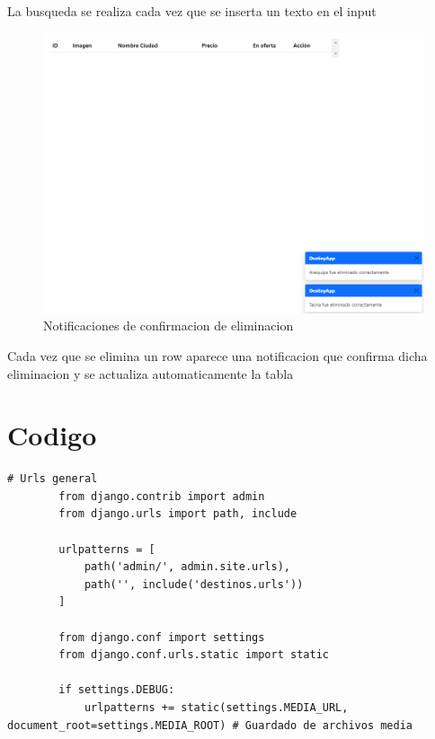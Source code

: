 \documentclass{article}
\begin{document}
        La busqueda se realiza cada vez que se inserta un texto en el input
        
        \begin{figure}
            \centering
            \includegraphics[width=150mm]{img/img10.png}
            \caption{Notificaciones de confirmacion de eliminacion}
            \label{fig:enter-label}
        \end{figure}
        
        Cada vez que se elimina un row aparece una notificacion que confirma dicha eliminacion y se actualiza automaticamente la tabla

        
\section{Codigo}
        \begin{lstlisting}[caption={Archivo urls.py}, label={codigo-urlsglobal}]
        # Urls general
        from django.contrib import admin
        from django.urls import path, include
        
        urlpatterns = [
            path('admin/', admin.site.urls),
            path('', include('destinos.urls'))
        ]
        
        from django.conf import settings
        from django.conf.urls.static import static
        
        if settings.DEBUG:
            urlpatterns += static(settings.MEDIA_URL, document_root=settings.MEDIA_ROOT) # Guardado de archivos media
        \end{lstlisting}
\end{document}
